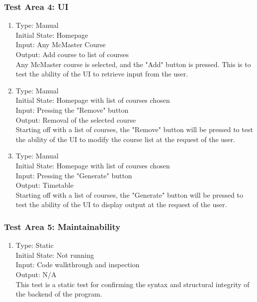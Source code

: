 \documentclass[11pt, oneside]{article}   	%
\begin{document}
\subsubsection{Test Area 4: UI}
\begin{enumerate}

\item Type: Manual \\
Initial State: Homepage \\
Input: Any McMaster Course \\
Output: Add course to list of courses \\
Any McMaster course is selected, and the "Add" button is pressed. This is to test the ability of the UI to retrieve input from the user. \\

\item Type: Manual \\
Initial State: Homepage with list of courses chosen\\
Input:  Pressing the "Remove" button \\
Output: Removal of the selected course \\
Starting off with a list of courses, the "Remove" button will be pressed to test the ability of the UI to modify the course list at the request of the user.  \\


\item Type: Manual \\
Initial State: Homepage with list of courses chosen\\
Input:  Pressing the "Generate" button \\
Output: Timetable \\
Starting off with a list of courses, the "Generate" button will be pressed to test the ability of the UI to display output at the request of the user.  \\
\end{enumerate}

\subsubsection{Test Area 5: Maintainability}
\begin{enumerate}
\item Type: Static \\
Initial State: Not running \\
Input: Code walkthrough and inspection\\
Output: N/A  \\
This test is a static test for confirming the syntax and structural integrity of the backend of the program.\\
\end{enumerate}
\end{document}

